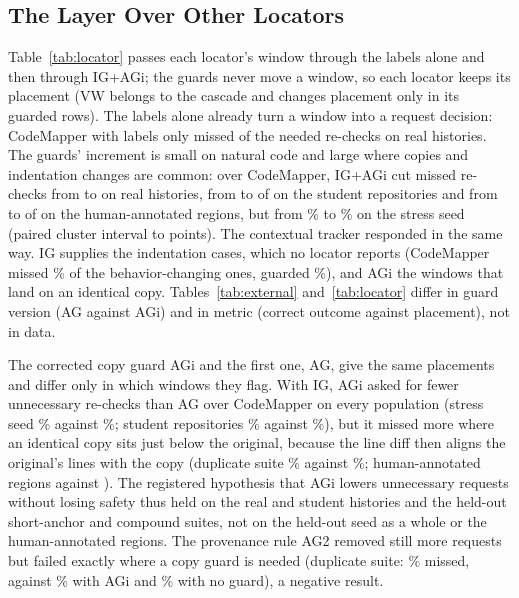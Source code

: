 

\subsection{The Layer Over Other Locators}
Table~\ref{tab:locator} passes each locator's window through the labels alone and then through IG+AGi; the guards never move a window, so each locator keeps its placement (VW belongs to the cascade and changes placement only in its guarded rows). The labels alone already turn a window into a request decision: CodeMapper with labels only missed \wiRealCmQMissK{} of the \wiRealCmQMissN{} needed re-checks on real histories. The guards' increment is small on natural code and large where copies and indentation changes are common: over CodeMapper, IG+AGi cut missed re-checks from \wiRealCmQMissK{} to \wiRealCmGiMissK{} on real histories, from \wiStuCmQMissK{} to \wiStuCmGiMissK{} of \wiStuCmQMissN{} on the student repositories and from \wiHumCmQMissK{} to \wiHumCmGiMissK{} of \wiHumCmQMissN{} on the human-annotated regions, but from \wiFrCmQMiss\% to \wiFrCmGiMiss\% on the stress seed (paired cluster interval \wiFrCmGiVsCmQMissLo{} to \wiFrCmGiVsCmQMissHi{} points). The contextual tracker responded in the same way. IG supplies the indentation cases, which no locator reports (CodeMapper missed \wiFrIndCmQMiss\% of the behavior-changing ones, guarded \wiFrIndCmGiMiss\%), and AGi the windows that land on an identical copy. Tables~\ref{tab:external} and~\ref{tab:locator} differ in guard version (AG against AGi) and in metric (correct outcome against placement), not in data.

The corrected copy guard AGi and the first one, AG, give the same placements and differ only in which windows they flag. With IG, AGi asked for fewer unnecessary re-checks than AG over CodeMapper on every population (stress seed \wiFrCmGiFalse\% against \wiFrCmGFalse\%; student repositories \wiStuCmGiFalse\% against \wiStuCmGFalse\%), but it missed more where an identical copy sits just below the original, because the line diff then aligns the original's lines with the copy (duplicate suite \wiFrDupCmGiMiss\% against \wiFrDupCmGMiss\%; human-annotated regions \wiHumCmGiMissK{} against \wiHumCmGMissK{}). The registered hypothesis that AGi lowers unnecessary requests without losing safety thus held on the real and student histories and the held-out short-anchor and compound suites, not on the held-out seed as a whole or the human-annotated regions. The provenance rule AG2 removed still more requests but failed exactly where a copy guard is needed (duplicate suite: \wiFrDupCasAGtwoMiss\% missed, against \wiFrDupCasAGiMiss\% with AGi and \wiFrDupDepMiss\% with no guard), a negative result.

